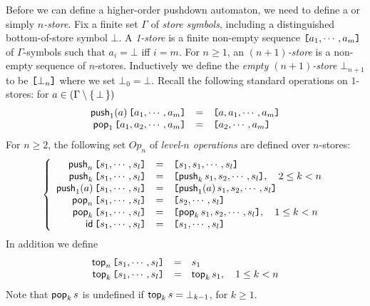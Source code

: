 Before we can define a higher-order pushdown automaton, we need to
define a  or simply \emph{$n$-store}.
Fix a finite set $\Gamma$ of \emph{store symbols}, including a
distinguished bottom-of-store symbol $\bot$. A \emph{1-store} is a
finite non-empty sequence $\hbox{\tt [}{a_1, \cdots, a_m}\hbox{\tt ]}$ of
$\Gamma$-symbols such that $a_i = \bot$ iff $i = m$. For $n \geq
1$, an \emph{$(n+1)$-store} is a non-empty sequence of $n$-stores.
Inductively we define the \emph{empty $(n+1)$-store} $\bot_{n+1}$
to be $\hbox{\tt [}{\bot_n}\hbox{\tt ]}$ where we set $\bot_0 = \bot$. Recall the
following standard operations on $1$-stores: for $a \in ({\Gamma}
\setminus \{\,{\bot}\,\})$
\[\begin{array}{rll}
\nonumber {\sf push}_1(a) \, \hbox{\tt [}{a_1,\cdots,a_m}\hbox{\tt ]} & = & \hbox{\tt [}{a,a_1,\cdots,a_m}\hbox{\tt ]}\\
\nonumber {\sf pop}_1 \, \hbox{\tt [}{a_1, a_2, \cdots, a_m}\hbox{\tt ]} & = & \hbox{\tt [}{a_2,\cdots,a_m}\hbox{\tt ]}\\
\end{array}\]
\renewcommand\arraystretch{1.3}
For $n \geq 2$, the following set $Op_n$ of \emph{level-$n$
operations} are defined over $n$-stores:
\[\left\{\begin{array}{rll}
{\sf push}_n \, \hbox{\tt [}{s_1, \cdots, s_l}\hbox{\tt ]} & = & \hbox{\tt [}{s_1, s_1, \cdots, s_l}\hbox{\tt ]}\\
{\sf push}_k \, \hbox{\tt [}{s_1, \cdots, s_l}\hbox{\tt ]} & = & \hbox{\tt [}{{\sf push}_k \, s_1,
s_2, \cdots, s_l}\hbox{\tt ]}, \quad 2 \leq k < n\\
{\sf push}_1 (a) \, \hbox{\tt [}{s_1, \cdots, s_l}\hbox{\tt ]} & = & \hbox{\tt [}{{\sf push}_1 (a) \, s_1, s_2, \cdots, s_l}\hbox{\tt ]}\\
{\sf pop}_n \, \hbox{\tt [}{s_1, \cdots, s_l}\hbox{\tt ]} & = & \hbox{\tt [}{s_2, \cdots, s_l}\hbox{\tt ]}\\
{\sf pop}_k \, \hbox{\tt [}{s_1, \cdots, s_l}\hbox{\tt ]} & = & \hbox{\tt [}{{\sf pop}_k \, s_1,
s_2, \cdots, s_l}\hbox{\tt ]}, \quad 1 \leq k < n\\
{\sf id} \, \hbox{\tt [}{s_1, \cdots, s_l}\hbox{\tt ]} & = & \hbox{\tt [}{s_1, \cdots, s_l}\hbox{\tt ]}\\
\end{array}\right.\]
In addition we define
\[\begin{array}{rll}
{\sf top}_n \, \hbox{\tt [}{s_1, \cdots, s_l}\hbox{\tt ]} & = & s_1\\
{\sf top}_k \, \hbox{\tt [}{s_1, \cdots, s_l}\hbox{\tt ]} & = & {\sf top}_k \, s_1, \quad 1
\leq k < n\\
\end{array}\]
Note that ${\sf pop}_{k} \, s$ is undefined if ${\sf top}_k \, s =
\bot_{k-1}$, for $k \geq 1$.

